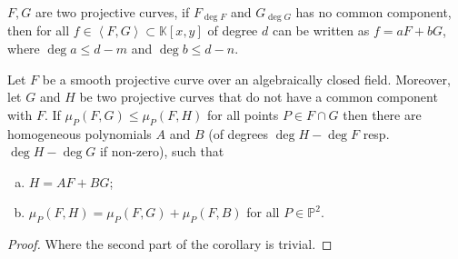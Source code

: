 \documentclass[10pt]{article}
\begin{document}
\begin{lemma}
  $ F, G$ are two projective curves, if $ F_{\deg F}$ and $ G_{\deg G}$  has no common component, then for all $ f \in \left< F,G \right> \subset \mathbb{K}[x,y]$ of degree $ d $ can be written as $ f = aF+ b G$, where $\deg a \le d - m$ and $\deg b \le d - n$.
\end{lemma}

\begin{corollary}
  Let $F$ be a smooth projective curve over an algebraically closed field. Moreover, let $G$ and $H$ be two projective curves that do not have a common component with $F$.
  If $\mu_P(F,G) \leq \mu_P(F,H)$ for all points $P \in F \cap G$ then there are homogeneous polynomials $A$ and $B$ (of degrees $\deg H - \deg F$ resp. $\deg H - \deg G$ if non-zero), such that
  \begin{enumerate}[(a)]
    \item $H = AF + BG$;
    \item $\mu_P(F,H) = \mu_P(F,G) + \mu_P(F,B)$ for all $P \in \mathbb{P}^2$.
  \end{enumerate}
\end{corollary}
\begin{proof}
  Where the second part of the corollary is trivial.
\end{proof}

\label{LastPage}
\end{document}
